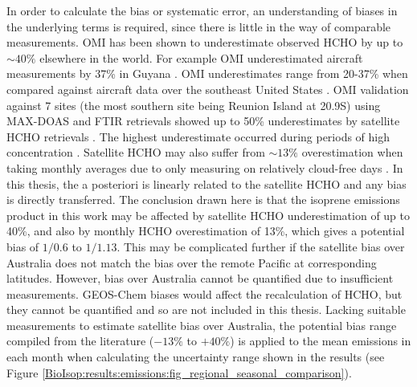     In order to calculate the bias or systematic error, an understanding of biases in the underlying terms is required, since there is little in the way of comparable measurements.
    OMI has been shown to underestimate observed HCHO by up to $\sim40\%$ elsewhere in the world.
    For example OMI underestimated aircraft measurements by 37\% in Guyana \parencite{Barkley2013}.
    OMI underestimates range from 20-37\% when compared against aircraft data over the southeast United States \parencite{Zhu2016}.
    OMI validation against 7 sites (the most southern site being Reunion Island at 20.9\degr S) using MAX-DOAS and FTIR retrievals showed up to 50\% underestimates by satellite HCHO retrievals \parencite{DeSmedt2015}.
    The highest underestimate occurred during periods of high concentration 
    \parencite{Vigouroux2009,DeSmedt2015}.
    Satellite HCHO may also suffer from $\sim{13}\%$ overestimation when taking monthly averages due to only measuring on relatively cloud-free days \parencite{Surl2018}.
    In this thesis, the a posteriori is linearly related to the satellite HCHO and any bias is directly transferred.
    The conclusion drawn here is that the isoprene emissions product in this work may be affected by satellite HCHO underestimation of up to 40\%, and also by monthly HCHO overestimation of 13\%, which gives a potential bias of $1/0.6$ to $1/1.13$.
    This may be complicated further if the satellite bias over Australia does not match the bias over the remote Pacific at corresponding latitudes.
    However, bias over Australia cannot be quantified due to insufficient measurements.
    GEOS-Chem biases would affect the recalculation of HCHO, but they cannot be quantified and so are not included in this thesis.
    Lacking suitable measurements to estimate satellite bias over Australia, the potential bias range compiled from the literature ($-13\%$ to $+40\%$) is applied to the mean emissions in each month when calculating the uncertainty range shown in the results (see Figure \ref{BioIsop:results:emissions:fig_regional_seasonal_comparison}).
    
      
      
